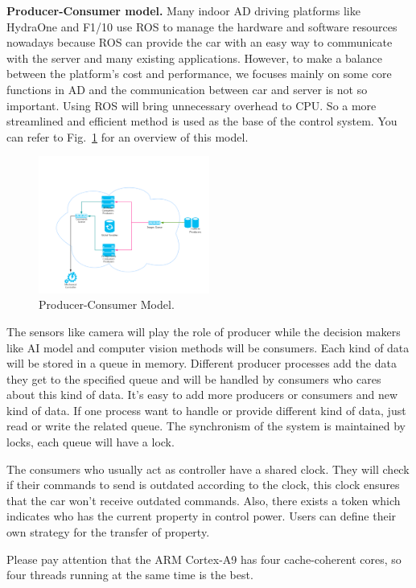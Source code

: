 \documentclass[conference]{IEEEtran}
\begin{document}
\begin{sloppypar}
\textbf{Producer-Consumer model.} Many indoor AD driving platforms like HydraOne\cite{b9} and F1/10\cite{b11} use ROS\cite{b19} to manage the hardware and software resources nowadays because ROS can provide the car with an easy way to communicate with the server and many existing applications. However, to make a balance between the platform's cost and performance, we focuses mainly on some core functions in AD and the communication between car and server is not so important. Using ROS will bring unnecessary overhead to CPU. So a more streamlined and efficient method is used as the base of the control system. You can refer to Fig.~\ref{pcm} for an overview of this model.


\begin{figure}[htbp]
\centerline{\includegraphics[width=0.5\textwidth]{pcm.jpg}}
\caption{Producer-Consumer Model.}
\label{pcm}
\end{figure}

The sensors like camera will play the role of producer while the decision makers like AI model and computer vision methods will be consumers. Each kind of data will be stored in a queue in memory. Different producer processes add the data they get to the specified queue and will be handled by consumers who cares about this kind of data. It's easy to add more producers or consumers and new kind of data. If one process want to handle or provide different kind of data, just read or write the related queue. The synchronism of the system is maintained by locks, each queue will have a lock.

The consumers who usually act as controller have a shared clock. They will check if their commands to send is outdated according to the clock, this clock ensures that the car won't receive outdated commands. Also, there exists a token which indicates who has the current property in control power. Users can define their own strategy for the transfer of property.

Please pay attention that the ARM Cortex-A9 has four cache-coherent cores, so four threads running at the same time is the best. 


\end{sloppypar}
\end{document}
